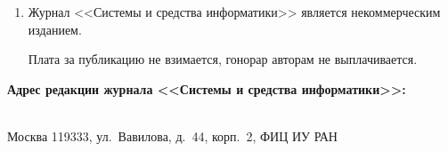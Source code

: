 {{\begin{enumerate}[1.]
\begin{itemize}
\item указывать в тексте письма название статьи, авторов и~журнал, в~который на\-прав\-ля\-ет\-ся статья;\\[-12pt]


\item использовать attach (присоединение);\\[-12pt]


\item в состав электронной версии статьи должны входить: файл, содержащий текст


статьи, и файл(ы), содержащий(е) иллюстрации.\\[-14pt]


\end{itemize}





\item Журнал <<Системы и средства информатики>> является некоммерческим изданием.


Плата за публикацию не взимается, гонорар авторам не выплачивается.


\end{enumerate}













\vspace*{-1.5mm}





\begin{center}





\textbf{Адрес редакции журнала <<Системы и средства информатики>>:} \\[-6pt]





\








Москва 119333, ул.~Вавилова, д.~44, корп.~2, ФИЦ ИУ РАН\\[-8pt]





\






\end{center}}}
